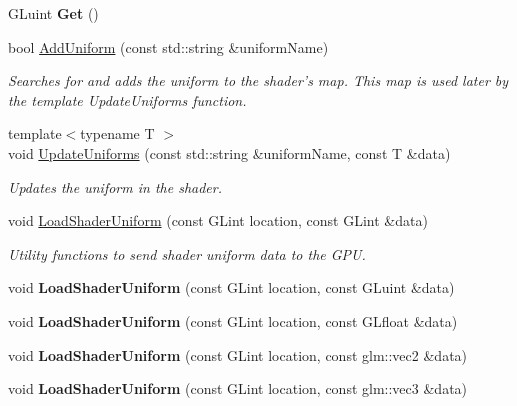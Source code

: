 \begin{DoxyCompactItemize}
\item 
\hypertarget{classDCEngine_1_1Shader_a755c9c0efbdc7ae7b298b107675aa43a}{G\-Luint {\bfseries Get} ()}\label{classDCEngine_1_1Shader_a755c9c0efbdc7ae7b298b107675aa43a}

\item 
bool \hyperlink{classDCEngine_1_1Shader_adc273977ddcfdf04a4043cc8603a97cd}{Add\-Uniform} (const std\-::string \&uniform\-Name)
\begin{DoxyCompactList}\small\item\em Searches for and adds the uniform to the shader's map. This map is used later by the template Update\-Uniforms function. \end{DoxyCompactList}\item 
{\footnotesize template$<$typename T $>$ }\\void \hyperlink{classDCEngine_1_1Shader_a85c6543d87072cff462d7d13a04b5b8c}{Update\-Uniforms} (const std\-::string \&uniform\-Name, const T \&data)
\begin{DoxyCompactList}\small\item\em Updates the uniform in the shader. \end{DoxyCompactList}\item 
void \hyperlink{classDCEngine_1_1Shader_aebbd137fba4e64fa15bcb0276f594aa5}{Load\-Shader\-Uniform} (const G\-Lint location, const G\-Lint \&data)
\begin{DoxyCompactList}\small\item\em Utility functions to send shader uniform data to the G\-P\-U. \end{DoxyCompactList}\item 
\hypertarget{classDCEngine_1_1Shader_ae52625488ce63327dd5a6a3134dfaeb1}{void {\bfseries Load\-Shader\-Uniform} (const G\-Lint location, const G\-Luint \&data)}\label{classDCEngine_1_1Shader_ae52625488ce63327dd5a6a3134dfaeb1}

\item 
\hypertarget{classDCEngine_1_1Shader_ad84c1fc97964c3b98f09be6d78d50cb4}{void {\bfseries Load\-Shader\-Uniform} (const G\-Lint location, const G\-Lfloat \&data)}\label{classDCEngine_1_1Shader_ad84c1fc97964c3b98f09be6d78d50cb4}

\item 
\hypertarget{classDCEngine_1_1Shader_a3073fb18cf992047ca52671de296261b}{void {\bfseries Load\-Shader\-Uniform} (const G\-Lint location, const glm\-::vec2 \&data)}\label{classDCEngine_1_1Shader_a3073fb18cf992047ca52671de296261b}

\item 
\hypertarget{classDCEngine_1_1Shader_afed41b84bb96ddc6bcff93ca803c27d4}{void {\bfseries Load\-Shader\-Uniform} (const G\-Lint location, const glm\-::vec3 \&data)}\label{classDCEngine_1_1Shader_afed41b84bb96ddc6bcff93ca803c27d4}


\end{DoxyCompactItemize}

